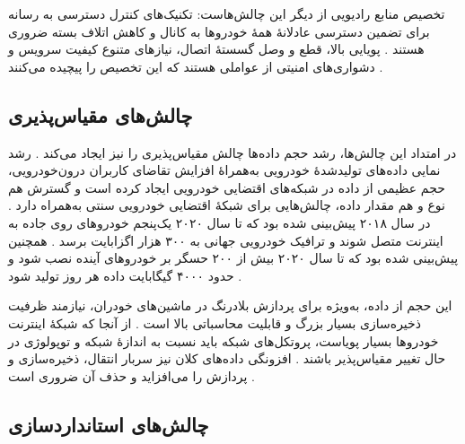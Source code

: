 \documentclass[12pt,a4paper]{article}
\begin{document}
تخصیص منابع رادیویی از دیگر این چالش‌هاست: تکنیک‌های کنترل دسترسی به رسانه  برای تضمین دسترسی عادلانهٔ همهٔ خودرو‌ها به کانال و کاهش اتلاف بسته ضروری هستند \cite{hozouriOverviewVANETVehicular2023}. پویایی بالا، قطع و وصل گسستهٔ اتصال، نیاز‌های متنوع کیفیت سرویس  و دشواری‌های امنیتی از عواملی هستند که این تخصیص را پیچیده می‌کنند \cite{hozouriOverviewVANETVehicular2023}.

\subsection{چالش‌های مقیاس‌پذیری}

در امتداد این چالش‌ها، رشد حجم داده‌ها چالش مقیاس‌پذیری را نیز ایجاد می‌کند \cite{xuInternetVehiclesBig2018}. رشد نمایی داده‌های تولیدشدهٔ خودرویی به‌همراهٔ افزایش تقاضای کاربران درون‌خودرویی، حجم عظیمی از داده در شبکه‌های اقتضایی خودرویی ایجاد کرده است و گسترش هم نوع و هم مقدار داده، چالش‌هایی برای شبکهٔ اقتضایی خودرویی سنتی به‌همراه دارد \cite{xuInternetVehiclesBig2018}. در سال ۲۰۱۸ پیش‌بینی شده بود که تا سال ۲۰۲۰ یک‌پنجم خودرو‌های روی جاده به اینترنت متصل شوند و ترافیک خودرویی جهانی به ۳۰۰ هزار اگزابایت برسد \cite{xuInternetVehiclesBig2018}. همچنین پیش‌بینی شده بود که تا سال ۲۰۲۰ بیش از ۲۰۰ حسگر بر خودرو‌های آینده نصب شود و حدود ۴۰۰۰ گیگابایت داده هر روز تولید شود \cite{xuInternetVehiclesBig2018}.

این حجم از داده، به‌ویژه برای پردازش بلادرنگ در ماشین‌های خودران، نیازمند ظرفیت ذخیره‌سازی بسیار بزرگ و قابلیت محاسباتی بالا است \cite{xuInternetVehiclesBig2018}. از آنجا که شبکهٔ اینترنت خودرو‌ها  بسیار پویاست، پروتکل‌های شبکه باید نسبت به اندازهٔ شبکه و توپولوژی در حال تغییر مقیاس‌پذیر باشند \cite{xuInternetVehiclesBig2018}. افزونگی داده‌های کلان نیز سربار انتقال، ذخیره‌سازی و پردازش را می‌افزاید و حذف آن ضروری است \cite{xuInternetVehiclesBig2018}.

\subsection{چالش‌های استانداردسازی}
\end{document}
